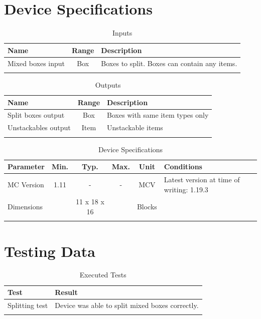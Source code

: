 \documentclass[10pt]{datasheet}
\begin{document}
\onecolumn

\section{Device Specifications}

\begin{table}[H]
    \caption{Inputs}
    \begin{tabularx}{\textwidth}{l | c | X}
        \thickhline
        \textbf{Name} & \textbf{Range} & \textbf{Description} \\
        \hline
        Mixed boxes input & Box & Boxes to split. Boxes can contain any items. \\
        \thickhline
\end{tabularx}
\end{table}

\begin{table}[H]
    \caption{Outputs}
    \begin{tabularx}{\textwidth}{l | c | X}
        \thickhline
        \textbf{Name} & \textbf{Range} & \textbf{Description} \\
        \hline
        Split boxes output & Box & Boxes with same item types only \\
        \hline
        Unstackables output & Item & Unstackable items \\
        \thickhline
\end{tabularx}
\end{table}

\begin{table}[H]
    \caption{Device Specifications}
    \begin{tabularx}{\textwidth}{l | c c c | c | X}
        \thickhline
        \textbf{Parameter} & \textbf{Min.} & \textbf{Typ.} & \textbf{Max.} &
        \textbf{Unit} & \textbf{Conditions} \\
        \hline
        MC Version & 1.11 & - & - & MCV & Latest version at time of writing: 1.19.3\\
        \hline
        Dimensions & & 11 x 18 x 16 & & Blocks & \\
        \thickhline
\end{tabularx}
\end{table}

\section{Testing Data}
\begin{table}[H]
    \caption{Executed Tests}
    \begin{tabularx}{\textwidth}{l | X}
        \thickhline
        \textbf{Test} & \textbf{Result} \\
        \hline
        Splitting test & Device was able to split mixed boxes correctly. \\
        \thickhline
\end{tabularx}
\end{table}
\end{document}
